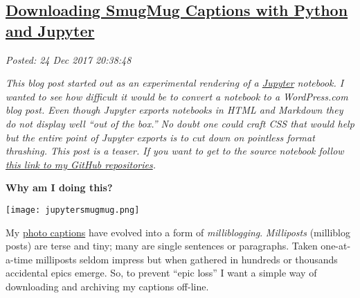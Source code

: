 %

\subsection*{\href{https://analyzethedatanotthedrivel.org/2017/12/24/downloading-smugmug-captions-with-python-and-jupyter/}{Downloading SmugMug Captions with Python and Jupyter}}


\noindent\emph{Posted: 24 Dec 2017 20:38:48}
\vspace{6pt}

\emph{This blog post started out as an experimental rendering of a
\href{https://jupyter.org/}{Jupyter} notebook. I wanted to see how
difficult it would be to convert a notebook to a WordPress.com blog
post. Even though Jupyter exports notebooks in HTML and Markdown they do
not display well ``out of the box.'' No doubt one could craft CSS that
would help but the entire point of Jupyter exports is to cut down on
pointless format thrashing. This post is a teaser. If you want to get to
the source notebook follow
\href{https://github.com/bakerjd99/smugpyter}{this link to my GitHub
repositories}.}


\medskip
\noindent\textbf{Why am I doing this?}
\medskip



\captionsetup[floatingfigure]{labelformat=empty}
\begin{floatingfigure}[r]{0.23\textwidth}
\centering
\texttt{[image: jupytersmugmug.png]}
\label{fig:5512x0}
\end{floatingfigure}My
\href{https://conceptcontrol.smugmug.com}{photo captions} have evolved
into a form of \emph{milliblogging}. \emph{Milliposts} (milliblog posts)
are terse and tiny; many are single sentences or paragraphs. Taken
one-at-a-time milliposts seldom impress but when gathered in hundreds or
thousands accidental epics emerge. So, to prevent ``epic loss'' I want a
simple way of downloading and archiving my captions off-line.


